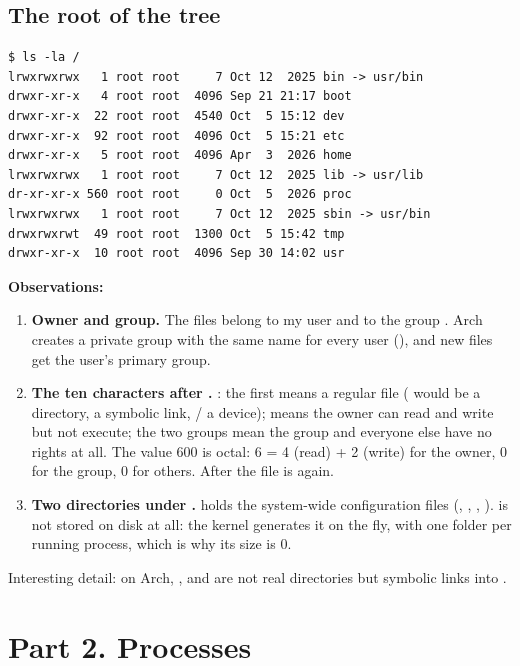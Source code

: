 \documentclass[11pt,a4paper]{article}
\begin{document}
\subsection{The root of the tree}

\begin{lstlisting}
$ ls -la /
lrwxrwxrwx   1 root root     7 Oct 12  2025 bin -> usr/bin
drwxr-xr-x   4 root root  4096 Sep 21 21:17 boot
drwxr-xr-x  22 root root  4540 Oct  5 15:12 dev
drwxr-xr-x  92 root root  4096 Oct  5 15:21 etc
drwxr-xr-x   5 root root  4096 Apr  3  2026 home
lrwxrwxrwx   1 root root     7 Oct 12  2025 lib -> usr/lib
dr-xr-xr-x 560 root root     0 Oct  5  2026 proc
lrwxrwxrwx   1 root root     7 Oct 12  2025 sbin -> usr/bin
drwxrwxrwt  49 root root  1300 Oct  5 15:42 tmp
drwxr-xr-x  10 root root  4096 Sep 30 14:02 usr
\end{lstlisting}

\textbf{Observations:}
\begin{enumerate}
  \item \textbf{Owner and group.} The files belong to my user  and to the group
  . Arch creates a private group with the same name for every user
  (), and new files get the user's primary group.
  \item \textbf{The ten characters after .} : the first
  \code{-} means a regular file ( would be a directory,  a symbolic link,
  / a device);  means the owner can read and write but not execute;
  the two \code{---} groups mean the group and everyone else have no rights at all. The value
  600 is octal: 6 = 4 (read) + 2 (write) for the owner, 0 for the group, 0 for others. After
   the file is  again.
  \item \textbf{Two directories under \code{/}.}  holds the system-wide
  configuration files (, , , ).
   is not stored on disk at all: the kernel generates it on the fly, with one
  folder per running process, which is why its size is 0.
\end{enumerate}

Interesting detail: on Arch, ,  and  are not real directories
but symbolic links into .

\section{Part 2. Processes}
\end{document}
